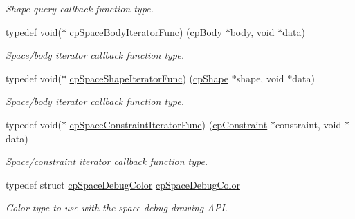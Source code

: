 \begin{DoxyCompactItemize}
\begin{DoxyCompactList}\small\item\em Shape query callback function type. \end{DoxyCompactList}\item 
\mbox{\label{group__cpSpace_ga2870b1128c5bfe79cb261d269abdea64}} 
typedef void($\ast$ \hyperlink{group__cpSpace_ga2870b1128c5bfe79cb261d269abdea64}{cp\+Space\+Body\+Iterator\+Func}) (\hyperlink{structcpBody}{cp\+Body} $\ast$body, void $\ast$data)
\begin{DoxyCompactList}\small\item\em Space/body iterator callback function type. \end{DoxyCompactList}\item 
\mbox{\label{group__cpSpace_gafae017c9a8a7c082032035bf165e4ec9}} 
typedef void($\ast$ \hyperlink{group__cpSpace_gafae017c9a8a7c082032035bf165e4ec9}{cp\+Space\+Shape\+Iterator\+Func}) (\hyperlink{structcpShape}{cp\+Shape} $\ast$shape, void $\ast$data)
\begin{DoxyCompactList}\small\item\em Space/body iterator callback function type. \end{DoxyCompactList}\item 
\mbox{\label{group__cpSpace_ga0bf20ed2411342352dc43b71c60649c1}} 
typedef void($\ast$ \hyperlink{group__cpSpace_ga0bf20ed2411342352dc43b71c60649c1}{cp\+Space\+Constraint\+Iterator\+Func}) (\hyperlink{structcpConstraint}{cp\+Constraint} $\ast$constraint, void $\ast$data)
\begin{DoxyCompactList}\small\item\em Space/constraint iterator callback function type. \end{DoxyCompactList}\item 
\mbox{\label{group__cpSpace_gafc46fcefca8c28112ca8245eef00bae7}} 
typedef struct \hyperlink{structcpSpaceDebugColor}{cp\+Space\+Debug\+Color} \hyperlink{group__cpSpace_gafc46fcefca8c28112ca8245eef00bae7}{cp\+Space\+Debug\+Color}
\begin{DoxyCompactList}\small\item\em Color type to use with the space debug drawing A\+PI. \end{DoxyCompactList}\item 

\end{DoxyCompactItemize}

